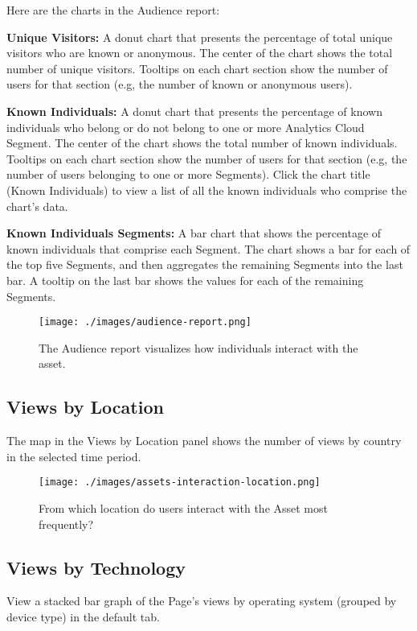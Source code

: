 Here are the charts in the Audience report:

\textbf{Unique Visitors:} A donut chart that presents the percentage of
total unique visitors who are known or anonymous. The center of the
chart shows the total number of unique visitors. Tooltips on each chart
section show the number of users for that section (e.g, the number of
known or anonymous users).

\textbf{Known Individuals:} A donut chart that presents the percentage
of known individuals who belong or do not belong to one or more
Analytics Cloud Segment. The center of the chart shows the total number
of known individuals. Tooltips on each chart section show the number of
users for that section (e.g, the number of users belonging to one or
more Segments). Click the chart title (Known Individuals) to view a list
of all the known individuals who comprise the chart's data.

\textbf{Known Individuals Segments:} A bar chart that shows the
percentage of known individuals that comprise each Segment. The chart
shows a bar for each of the top five Segments, and then aggregates the
remaining Segments into the last bar. A tooltip on the last bar shows
the values for each of the remaining Segments.

\begin{figure}
\centering
\texttt{[image: ./images/audience-report.png]}
\caption{The Audience report visualizes how individuals interact with
the asset.}
\end{figure}

\subsection{Views by Location}\label{views-by-location-2}

The map in the Views by Location panel shows the number of views by
country in the selected time period.

\begin{figure}
\centering
\texttt{[image: ./images/assets-interaction-location.png]}
\caption{From which location do users interact with the Asset most
frequently?}
\end{figure}

\subsection{Views by Technology}\label{views-by-technology-3}

View a stacked bar graph of the Page's views by operating system
(grouped by device type) in the default tab.

